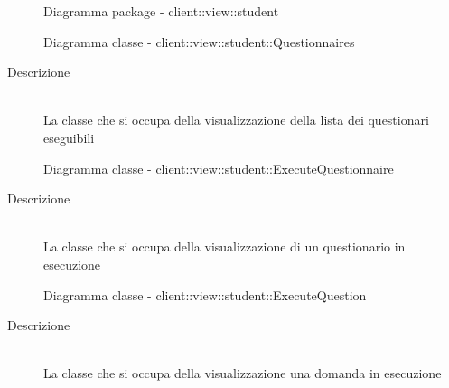\begin{center}
\begin{figure}[H]
		\caption{Diagramma package - client::view::student}
	\end{figure}
\end{center}\hypertarget{client::view::student::Questionnaires}{}
\begin{figure}[H]
	\centering
	\caption{Diagramma classe - client::view::student::Questionnaires}
\end{figure}\begin{description}
\item[Descrizione] \hfill \\
La classe che si occupa della visualizzazione della lista dei questionari eseguibili
\end{description}

\vspace{0.5cm}
\hypertarget{client::view::student::ExecuteQuestionnaire}{}
\begin{figure}[H]
	\centering
	\caption{Diagramma classe - client::view::student::ExecuteQuestionnaire}
\end{figure}\begin{description}
\item[Descrizione] \hfill \\
La classe che si occupa della visualizzazione di un questionario in esecuzione
\end{description}

\vspace{0.5cm}
\hypertarget{client::view::student::ExecuteQuestion}{}
\begin{figure}[H]
	\centering
	\caption{Diagramma classe - client::view::student::ExecuteQuestion}
\end{figure}\begin{description}
\item[Descrizione] \hfill \\
La classe che si occupa della visualizzazione una domanda in esecuzione
\end{description}

